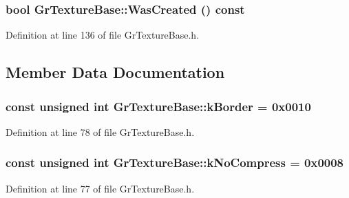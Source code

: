 \begin{CompactItemize}
\hypertarget{class_gr_texture_base_2c2c9ce5410067d710b26d4dfe37721d}{
\subsubsection[{WasCreated}]{\setlength{\rightskip}{0pt plus 5cm}bool GrTextureBase::WasCreated () const}}
\label{class_gr_texture_base_2c2c9ce5410067d710b26d4dfe37721d}




Definition at line 136 of file GrTextureBase.h.

\subsection{Member Data Documentation}
\hypertarget{class_gr_texture_base_eadfc66a46b95c9a456782906da84890}{
\subsubsection[{kBorder}]{\setlength{\rightskip}{0pt plus 5cm}const unsigned int {\bf GrTextureBase::kBorder} = 0x0010}}
\label{class_gr_texture_base_eadfc66a46b95c9a456782906da84890}




Definition at line 78 of file GrTextureBase.h.\hypertarget{class_gr_texture_base_184780018f2b67996c9274798e52607e}{
\subsubsection[{kNoCompress}]{\setlength{\rightskip}{0pt plus 5cm}const unsigned int {\bf GrTextureBase::kNoCompress} = 0x0008}}
\label{class_gr_texture_base_184780018f2b67996c9274798e52607e}




Definition at line 77 of file GrTextureBase.h.\hypertarget{class_gr_texture_base_47f4a8d764ba3c8e9e353a394edfcd2c}{
}
\end{CompactItemize}

